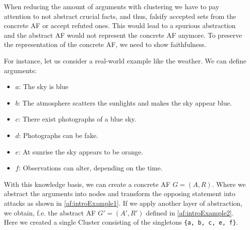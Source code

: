 When reducing the amount of arguments with clustering we have to pay attention to not abstract crucial facts, and thus, falsify accepted sets from the concrete \ac{AF} or accept refuted ones. This would lead to a spurious abstraction and the abstract \ac{AF} would not represent the concrete \ac{AF} anymore. To preserve the representation of the concrete \ac{AF}, we need to show faithfulness.


For instance, let us consider a real-world example like the weather. We can define arguments:

\begin{itemize}
    \item $a$: The sky is blue
    \item $b$: The atmosphere scatters the sunlights and makes the sky appear blue. 
    \item $c$: There exist photographs of a blue sky. 
    \item $d$: Photographs can be fake.
    \item $e$: At sunrise the sky appears to be orange. 
    \item $f$: Observations can alter, depending on the time.
\end{itemize}

With this knowledge basis, we can create a concrete \ac{AF} $G = (A, R)$. Where we abstract the arguments into nodes and transform the opposing statement into attacks as shown in \ref{af:introExample1}. If we apply another layer of abstraction, we obtain, f.e. the abstract \ac{AF} $G' = (A', R')$ defined in \ref{af:introExample2}. Here we created a single Cluster consisting of the singletons \texttt{\{a, b, c, e, f\}}.



